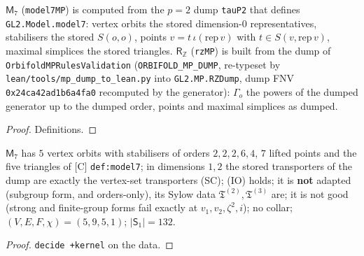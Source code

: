 \begin{definition}\label{def:mp-models}
  \leanok
  $\mathsf M_7$ (\texttt{model7MP}) is computed from the $p=2$ dump \texttt{tauP2} that defines \texttt{GL2.Model.model7}: vertex
  orbits the stored dimension-$0$ representatives, stabilisers the stored $S(o,o)$, points $v=t\,\iota(\mathrm{rep}\,v)$ with
  $t\in S(v,\mathrm{rep}\,v)$, maximal simplices the stored triangles.  $\mathsf R_{\mathbb Z}$ (\texttt{rzMP}) is built from the dump of
  \texttt{OrbifoldMPRulesValidation} (\texttt{ORBIFOLD\_MP\_DUMP}, re-typeset by \texttt{lean/tools/mp\_dump\_to\_lean.py} into
  \texttt{GL2.MP.RZDump}, dump FNV \texttt{0x24ca42ad1b6a4fa0} recomputed by the generator): $\Gamma_o$ the powers of the dumped
  generator up to the dumped order, points and maximal simplices as dumped.
\end{definition}
\begin{proof}
  \leanok
  Definitions.
\end{proof}

\begin{theorem}\label{thm:mp-model7-rules}
  \leanok
  $\mathsf M_7$ has $5$ vertex orbits with stabilisers of orders $2,2,2,6,4$, $7$ lifted points and the five triangles of [C]
  \texttt{def:model7}; in dimensions $1,2$ the stored transporters of the dump are exactly the vertex-set transporters (SC); (IO) holds;
  it is \textbf{not} adapted (subgroup form, and orders-only), its Sylow data $\mathfrak T^{(2)},\mathfrak T^{(3)}$ are; it is not good
  (strong and finite-group forms fail exactly at $v_1,v_2,\zeta^2,i$); no collar; $(V,E,F,\chi)=(5,9,5,1)$; $\lvert \mathsf S_1\rvert=132$.
\end{theorem}
\begin{proof}
  \leanok
  \texttt{decide +kernel} on the data.
\end{proof}

